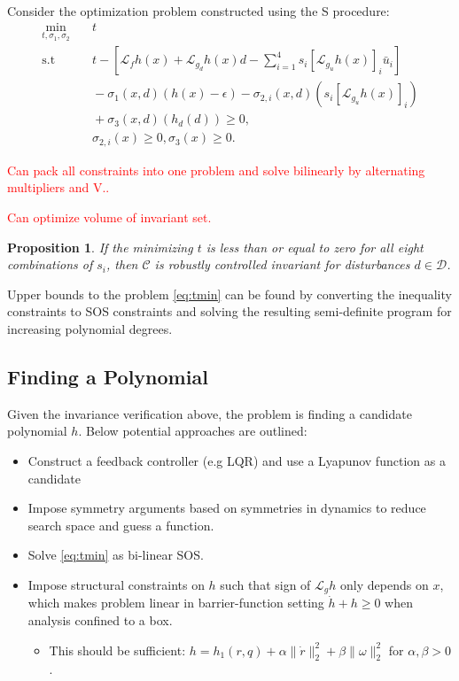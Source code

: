 \documentclass[conference]{IEEEtran}
\newtheorem{prop}{Proposition}
\begin{document}
Consider the optimization problem constructed using the S procedure:
\begin{equation}
\label{eq:tmin}
\begin{aligned}
  \min_{t, \sigma_1, \sigma_2} & \quad t \\
  \text{s.t} &  \quad  t - \left[ \mathcal L_f h(x) + \mathcal L_{g_d} h(x) d -\sum_{i=1}^4 s_i \left[\mathcal L_{g_u} h(x) \right]_i \bar u_i \right] \\
             & \quad - \sigma_1(x,d) \left( h(x) - \epsilon \right) - \sigma_{2,i}(x,d) \left( s_i \left[ \mathcal L_{g_u} h(x) \right]_i \right) \\
             & \quad + \sigma_3(x,d) \left( h_d(d) \right) \geq 0, \\
             & \quad  \sigma_{2,i}(x) \geq 0, \sigma_3(x) \geq 0.
\end{aligned}
\end{equation}

\textcolor{red}{Can pack all constraints into one problem and solve bilinearly by alternating multipliers and V..}

\textcolor{red}{Can optimize volume of invariant set.}

\begin{prop}
  If the minimizing $t$ is less than or equal to zero for all eight combinations of $s_i$, then $\mathcal C$ is robustly controlled invariant for disturbances $d \in \mathcal D$.
\end{prop}

Upper bounds to the problem \eqref{eq:tmin} can be found by converting the inequality constraints to SOS constraints and solving the resulting semi-definite program for increasing polynomial degrees.

\subsection{Finding a Polynomial}

Given the invariance verification above, the problem is finding a candidate polynomial $h$. Below potential approaches are outlined:
\begin{itemize}
   \item Construct a feedback controller (e.g LQR) and use a Lyapunov function as a candidate
   \item Impose symmetry arguments based on symmetries in dynamics to reduce search space and guess a function.
   \item Solve \eqref{eq:tmin} as bi-linear SOS.
   \item Impose structural constraints on $h$ such that sign of $\mathcal L_g h$ only depends on $x$, which makes problem linear in barrier-function setting $\dot h + h \geq 0$ when analysis confined to a box.
   \begin{itemize}
     \item This should be sufficient: $h = h_1(r,q) + \alpha \| \dot r \|^2_2 + \beta \| \omega \|_2^2$ for $\alpha, \beta > 0$.
   \end{itemize} 
\end{itemize} 


\printbibliography 
\end{document}
